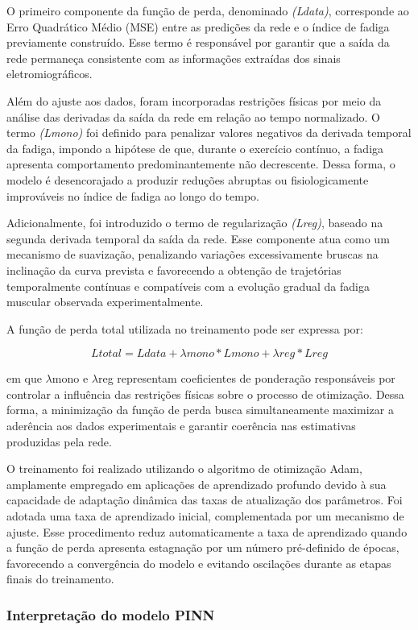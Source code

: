 \documentclass[symbols]{fei}
\begin{document}
O primeiro componente da função de perda, denominado \textit{(Ldata)}, corresponde ao Erro Quadrático Médio (MSE) entre as predições da rede e o 
índice de fadiga previamente construído. Esse termo é responsável por garantir que a saída da rede permaneça consistente com as 
informações extraídas dos sinais eletromiográficos.

Além do ajuste aos dados, foram incorporadas restrições físicas por meio da análise das derivadas da 
saída da rede em relação ao tempo normalizado. O termo \textit{(Lmono)} foi definido para 
penalizar valores negativos da derivada temporal da fadiga, impondo a hipótese de que, durante o exercício contínuo, a fadiga 
apresenta comportamento predominantemente não decrescente. Dessa forma, o modelo é desencorajado a 
produzir reduções abruptas ou fisiologicamente improváveis no índice de fadiga ao longo do tempo.

Adicionalmente, foi introduzido o termo de regularização \textit{(Lreg)}, baseado na 
segunda derivada temporal da saída da rede. Esse componente atua como um mecanismo de 
suavização, penalizando variações excessivamente bruscas na inclinação da curva prevista e 
favorecendo a obtenção de trajetórias temporalmente contínuas e compatíveis com a evolução gradual da fadiga muscular observada experimentalmente.

A função de perda total utilizada no treinamento pode ser expressa por:

\[
	Ltotal = Ldata + \lambda mono * Lmono + \lambda reg * Lreg
\]

em que $\lambda$mono e $\lambda$reg representam coeficientes de ponderação responsáveis por 
controlar a influência das restrições físicas sobre o processo de otimização. Dessa forma, a minimização da 
função de perda busca simultaneamente maximizar a aderência aos dados experimentais e garantir coerência nas estimativas produzidas pela rede.

O treinamento foi realizado utilizando o algoritmo de otimização Adam, amplamente 
empregado em aplicações de aprendizado profundo devido à sua capacidade de adaptação 
dinâmica das taxas de atualização dos parâmetros. Foi adotada uma taxa de aprendizado 
inicial, complementada por um mecanismo de ajuste. Esse procedimento reduz automaticamente a taxa de 
aprendizado quando a função de perda apresenta estagnação por um 
número pré-definido de épocas, favorecendo a convergência do modelo e evitando oscilações durante as etapas finais do treinamento.


\subsubsection{Interpretação do modelo PINN}
\end{document}
